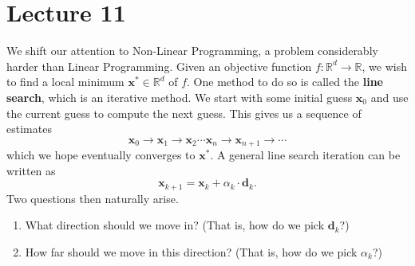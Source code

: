 \section{Lecture 11}

We shift our attention to Non-Linear Programming, a problem considerably harder than Linear Programming. Given an objective function $f \colon \mathbb{R}^d \to \mathbb{R}$, we wish to find a local minimum $\mathbf{x}^* \in \mathbb{R}^d$ of $f$. One method to do so is called the \textbf{line search}, which is an iterative method. We start with some initial guess $\mathbf{x}_0$ and use the current guess to compute the next guess. This gives us a sequence of estimates
\[
    \mathbf{x}_0 \to \mathbf{x}_1 \to \mathbf{x}_2 \cdots \mathbf{x}_n \to \mathbf{x}_{n+1} \to \cdots
\]
which we hope eventually converges to $\mathbf{x}^*$. A general line search iteration can be written as
\[
    \mathbf{x}_{k+1} = \mathbf{x}_k + \alpha_k \cdot \mathbf{d}_k.
\]
Two questions then naturally arise.
\begin{enumerate}
    \item What direction should we move in? (That is, how do we pick $\mathbf{d}_k$?)
    \item How far should we move in this direction? (That is, how do we pick $\alpha_k$?)
\end{enumerate}